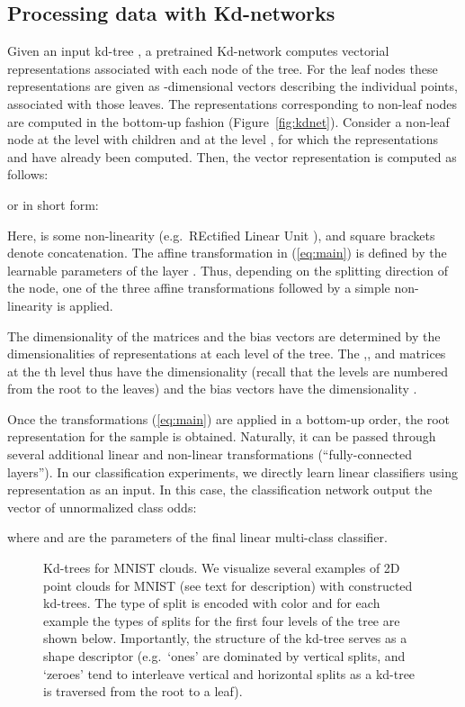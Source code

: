 \documentclass[10pt,twocolumn,letterpaper]{article}
\newcommand{\fig}[1]{Figure~\ref{fig:#1}}
\newcommand{\eq}[1]{(\ref{eq:#1})}
\begin{document}
\subsection{Processing data with Kd-networks}
Given an input kd-tree , a pretrained Kd-network computes vectorial representations  associated with each node of the tree. For the leaf nodes these representations are given as -dimensional vectors describing the individual points, associated with those leaves. The representations corresponding to non-leaf nodes are computed in the bottom-up fashion (\fig{kdnet}). Consider a non-leaf node  at the level  with children  and  at the level , for which the representations  and  have already been computed. Then, the vector representation  is computed as follows:

or in short form:

Here,  is some non-linearity (e.g.\ REctified Linear Unit ), and square brackets denote concatenation. The affine transformation in \eq{main} is defined by the learnable parameters  of the layer . Thus, depending on the splitting direction  of the node, one of the three affine transformations followed by a simple non-linearity is applied. 

The dimensionality of the matrices and the bias vectors are determined by the dimensionalities  of representations at each level of the tree. The  ,, and  matrices at the th level thus have the dimensionality  (recall that the levels are numbered from the root to the leaves) and the bias vectors  have the dimensionality .

Once the transformations \eq{main} are applied in a bottom-up order, the root representation  for the sample  is obtained. Naturally, it can be passed through several additional linear and non-linear transformations (``fully-connected layers''). In our classification experiments, we directly learn linear classifiers using  representation as an input. In this case, the classification network output the vector of unnormalized class odds:

where  and  are the parameters of the final linear multi-class classifier.

\begin{figure}
    \centering
    \caption{Kd-trees for MNIST clouds. We visualize several examples of 2D point clouds for MNIST (see text for description) with constructed kd-trees. The type of split is encoded with color and for each example the types of splits for the first four levels of the tree are shown below. Importantly, the structure of the kd-tree serves as a shape descriptor (e.g.\ `ones' are dominated by vertical splits, and `zeroes' tend to interleave vertical and horizontal splits as a kd-tree is traversed from the root to a leaf).}
    \label{fig:kd_trees_mnist}
\end{figure}
\end{document}
